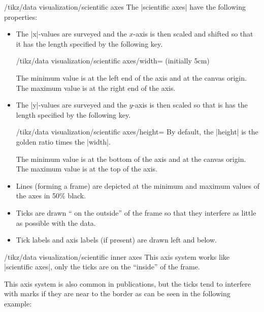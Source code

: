 \begin{key}{/tikz/data visualization/scientific axes}
  The |scientific axes| have the following properties:
  \begin{itemize}
  \item The |x|-values are surveyed and the $x$-axis is then scaled
    and shifted so  that it has the length specified by the following key.
    \begin{key}{/tikz/data visualization/scientific
        axes/width= (initially 5cm)}
    \end{key}
    The minimum value is at the left end of the axis and at the canvas
    origin. The maximum value is at the right end of the axis.
  \item The |y|-values are surveyed and the $y$-axis is then scaled so
    that is has the length specified by the following key.
    \begin{key}{/tikz/data visualization/scientific
        axes/height=}
      By default, the |height| is the golden ratio times the |width|.
    \end{key}
    The minimum value is at the bottom of the axis and at the canvas
    origin. The maximum value is at the top of the axis.
  \item Lines (forming a frame) are depicted at the minimum and
    maximum values of the axes in 50\% black.
  \item Ticks are drawn `` on the outside'' of the frame so that they
    interfere as little as possible with the data.
  \item Tick labels and axis labels (if present) are drawn left and
    below.
  \end{itemize}
\end{key}

\begin{key}{/tikz/data visualization/scientific inner axes}
  This axis system works like |scientific axes|, only the ticks are on
  the ``inside'' of the frame.

\begin{codeexample}[width=7cm]
\end{codeexample}

  This axis system is also common in publications, but the ticks tend
  to interfere with marks if they are near to the border as can be
  seen in the following example:
\begin{codeexample}[]
\end{codeexample}

\end{key}

